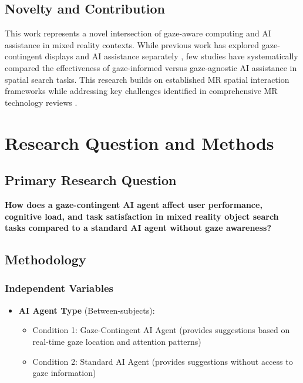 \documentclass[12pt,letterpaper]{article}
\begin{document}
\subsection{Novelty and Contribution}

This work represents a novel intersection of gaze-aware computing and AI assistance in mixed reality contexts. While previous work has explored gaze-contingent displays and AI assistance separately \citep{schleusissinger2021information}, few studies have systematically compared the effectiveness of gaze-informed versus gaze-agnostic AI assistance in spatial search tasks. This research builds on established MR spatial interaction frameworks \citep{barba2017primer} while addressing key challenges identified in comprehensive MR technology reviews \citep{rokhsaritalemi2020review}.

\section{Research Question and Methods}

\subsection{Primary Research Question}
\textbf{How does a gaze-contingent AI agent affect user performance, cognitive load, and task satisfaction in mixed reality object search tasks compared to a standard AI agent without gaze awareness?}

\subsection{Methodology}

\subsubsection{Independent Variables}
\begin{itemize}
    \item \textbf{AI Agent Type} (Between-subjects):
    \begin{itemize}
        \item Condition 1: Gaze-Contingent AI Agent (provides suggestions based on real-time gaze location and attention patterns)
        \item Condition 2: Standard AI Agent (provides suggestions without access to gaze information)
    \end{itemize}
\end{itemize}
\end{document}
